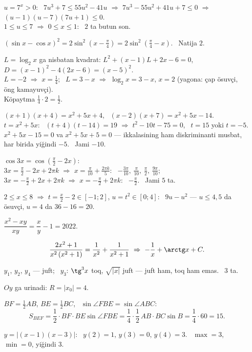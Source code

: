 $u=7^x>0$: \ $7u^3+7\le55u^2-41u$ $\Rightarrow$ $7u^3-55u^2+41u+7\le0$ $\Rightarrow$ $(u-1)(u-7)(7u+1)\le0$.\\
$1\le u\le7$ $\Rightarrow$ $0\le x\le1$: \ $2$ ta butun son.

$(\sin x-\cos x)^2=2\sin^2\left(x-\frac\pi4\right)=2\sin^2\left(\frac\pi4-x\right)$. \ Natija $2$.

$L=\log_2x$ ga nisbatan kvadrat: $L^2+(x-1)L+2x-6=0$, \ $D=(x-1)^2-4(2x-6)=(x-5)^2$.\\
$L=-2$ $\Rightarrow$ $x=\frac14$; \ $L=3-x$ $\Rightarrow$ $\log_2x=3-x$, $x=2$ (yagona: çap ösuvçi, öng kamayuvçi).\\
Köpaytma $\frac14\cdot2=\frac12$.

$(x+1)(x+4)=x^2+5x+4$, \ $(x-2)(x+7)=x^2+5x-14$. \ $t=x^2+5x$: \ $(t+4)(t-14)=19$ $\Rightarrow$ $t^2-10t-75=0$, \ $t=15$ yoki $t=-5$.\\
$x^2+5x-15=0$ va $x^2+5x+5=0$ — ikkalasining ham diskriminanti musbat, har birida yiğindi $-5$. \ Jami $-10$.

$\cos3x=\cos\left(\frac\pi2-2x\right)$:\\
$3x=\frac\pi2-2x+2\pi k$ $\Rightarrow$ $x=\frac\pi{10}+\frac{2\pi k}5$: \ $-\frac{3\pi}{10},\ \frac\pi{10},\ \frac\pi2,\ \frac{9\pi}{10}$;\\
$3x=-\frac\pi2+2x+2\pi k$ $\Rightarrow$ $x=-\frac\pi2+2\pi k$: \ $-\frac\pi2$. \ Jami $5$ ta.

$2\le x\le8$ $\Rightarrow$ $t=\frac x2-2\in[-1;2]$, $u=t^2\in[0;4]$: \ $9u-u^2$ — $u\le4{,}5$ da ösuvçi, $u=4$ da $36-16=20$.

$\dfrac{x^2-xy}{xy}=\dfrac xy-1=2022$.

\[\frac{2x^2+1}{x^2\left(x^2+1\right)}=\frac1{x^2}+\frac1{x^2+1}\ \Rightarrow\ -\frac1x+\arctg x+C.\]

$y_1$, $y_2$, $y_4$ — juft; \ $y_3$: $\tg^3x$ toq, $\sqrt{|x|}$ juft — juft ham, toq ham emas. \ $3$ ta.

$Oy$ ga urinadi: $R=|x_0|=4$.

$BF=\frac12AB$, $BE=\frac12BC$, \ $\sin\angle FBE=\sin\angle ABC$:
\[S_{BEF}=\frac12\cdot BF\cdot BE\sin\angle FBE=\frac14\cdot\frac12\,AB\cdot BC\sin B=\frac14\cdot60=15.\]

$y=|(x-1)(x-3)|$: \ $y(2)=1$, $y(3)=0$, $y(4)=3$. \ $\max=3$, $\min=0$, yiğindi $3$.

